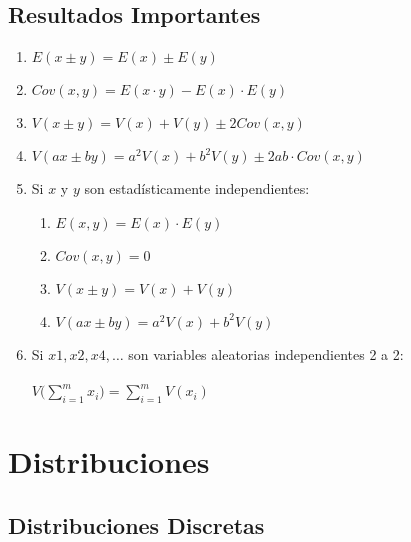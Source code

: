 \documentclass[10pt,letterpaper]{article}
\begin{document}
\subsection{Resultados Importantes}
\begin{enumerate}
\item $E(x\pm y)=E(x)\pm E(y)$
\item $Cov(x,y)=E(x\cdot y)-E(x)\cdot E(y)$
\item $V(x\pm y)=V(x)+V(y)\pm 2Cov(x,y)$
\item $V(ax\pm by)=a^2V(x)+b^2V(y) \pm 2ab\cdot Cov(x,y)$
\item Si $x$ y $y$ son estadísticamente independientes:
\begin{enumerate}
\item $E(x,y)=E(x)\cdot E(y)$
\item $Cov(x,y)=0$
\item $V(x\pm y)=V(x)+V(y)$
\item $V(ax\pm by)=a^2V(x)+b^2V(y)$
\end{enumerate}
\item Si $x1,x2,x4,\ldots$ son variables aleatorias independientes 2 a 2:\\ \vspace{0.025cm} \\
$V\Bigg( \displaystyle\sum_{i=1}^{m} x_i \Bigg) = \displaystyle\sum_{i=1}^{m} V(x_i)$
\end{enumerate}

\section{Distribuciones}
\subsection{Distribuciones Discretas}
\end{document}
